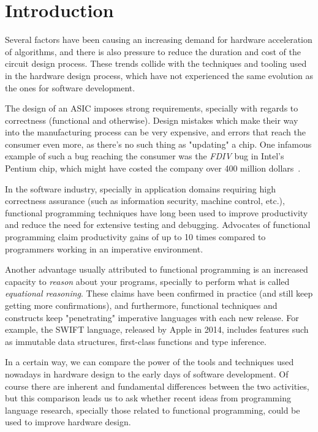 \chapter{Introduction}
\label{chap:intro}
    Several factors have been causing an increasing demand for hardware acceleration of algorithms,
    and there is also pressure to reduce the duration and cost of the circuit design process.
    These trends collide with the techniques and tooling used in the hardware design process,
    which have not experienced the same evolution as the ones for software development.

    The design of an \ac{ASIC} imposes strong requirements,
    specially with regards to correctness (functional and otherwise).
    Design mistakes which make their way into the manufacturing process can be very expensive,
    and errors that reach the consumer even more, as there's no such thing as "updating" a chip.
    One infamous example of such a bug reaching the consumer was the \emph{FDIV} bug in Intel's Pentium chip,
    which might have costed the company over 400 million dollars~\cite{intel-fdiv}.

    In the software industry, specially in application domains requiring high correctness assurance
    (such as information security, machine control, etc.),
    functional programming techniques have long been used to improve productivity
    and reduce the need for extensive testing and debugging.
    Advocates of functional programming claim productivity gains of up to 10 times compared to
    programmers working in an imperative environment.

    Another advantage usually attributed to functional programming is an increased capacity to
    \emph{reason} about your programs, specially to perform what is called \emph{equational reasoning}.
    These claims have been confirmed in practice (and still keep getting more confirmations),
    and furthermore, functional techniques and constructs keep "penetrating" imperative languages
    with each new release. For example, the SWIFT language, released by Apple in 2014,
    includes features such as immutable data structures, first-class functions and type inference.


    In a certain way, we can compare the power of the tools and techniques
    used nowadays in hardware design to the early days of software development.
    Of course there are inherent and fundamental differences between the two activities, but
    this comparison leads us to ask whether recent ideas from programming language research,
    specially those related to functional programming, could be used to improve hardware design.

